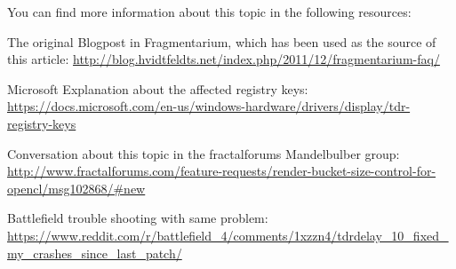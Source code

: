 You can find more information about this topic in the following resources:

The original Blogpost in Fragmentarium, which has been used as the source of this article: \url{http://blog.hvidtfeldts.net/index.php/2011/12/fragmentarium-faq/}

Microsoft Explanation about the affected registry keys: \url{https://docs.microsoft.com/en-us/windows-hardware/drivers/display/tdr-registry-keys}

Conversation about this topic in the fractalforums Mandelbulber group:
\url{http://www.fractalforums.com/feature-requests/render-bucket-size-control-for-opencl/msg102868/#new}

Battlefield trouble shooting with same problem:
\url{https://www.reddit.com/r/battlefield_4/comments/1xzzn4/tdrdelay_10_fixed_my_crashes_since_last_patch/}